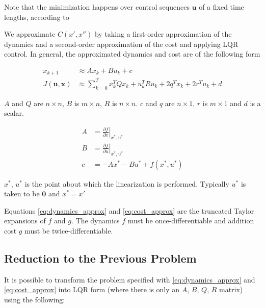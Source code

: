 \documentclass[letterpaper, 10pt, english, conference]{IEEEtran}
\begin{document}
Note that the minimization happens over control sequences $\mathbf{u}$
of a fixed time lengths, according to 

We approximate $C\left(x',x''\right)$ by taking a first-order approximation
of the dynamics and a second-order approximation of the cost and applying
LQR control. In general, the approximated dynamics and cost are of
the following form

\begin{align}
x_{k+1} & \approx Ax_{k}+Bu_{k}+c\label{eq:dynamics_approx}\\
J\left(\mathbf{u},\mathbf{x}\right) & \approx\sum_{k=0}^{T}x_{k}^{T}Qx_{k}+u_{k}^{T}Ru_{k}+2q^{T}x_{k}+2r^{T}u_{k}+d\label{eq:cost_approx}
\end{align}


$A$ and $Q$ are $n\times n$, $B$ is $m\times n$, $R$ is $n\times n$.
$c$ and $q$ are $n\times1$, $r$ is $m\times1$ and $d$ is a scalar.

\begin{align*}
A & =\left.\frac{\partial f}{\partial x}\right|_{x^{*},u^{*}}\\
B & =\left.\frac{\partial f}{\partial u}\right|_{x^{*},u^{*}}\\
c & =-Ax^{*}-Bu^{*}+f\left(x^{*},u^{*}\right)
\end{align*}


$x^{*}$, $u^{*}$ is the point about which the linearization is performed.
Typically $u^{*}$ is taken to be $\mathbf{0}$ and $x^{*}=x'$

Equations \ref{eq:dynamics_approx} and \ref{eq:cost_approx} are
the truncated Taylor expansions of $f$ and $g$. The dynamics $f$
must be once-differentiable and addition cost $g$ must be twice-differentiable.


\subsection{Reduction to the Previous Problem}

It is possible to transform the problem specified with \ref{eq:dynamics_approx}
and \ref{eq:cost_approx} into LQR form (where there is only an $A$,
$B$, $Q$, $R$ matrix) using the following:
\end{document}
